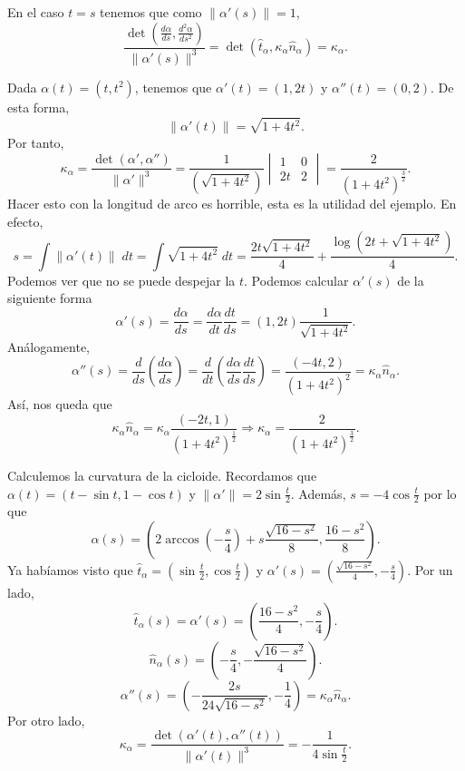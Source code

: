 \begin{observation}
En el caso $\displaystyle t = s $ tenemos que como $\displaystyle \|\alpha'\left(s\right)\| = 1 $,
\[\frac{\det\left(\frac{d\alpha }{d s}, \frac{d ^{2}\alpha }{d s^{2}}\right)}{\|\alpha'\left(s\right)\|^{3}} = \det\left(\hat{t}_{\alpha }, \kappa_{\alpha }\hat{n}_{\alpha }\right)=\kappa_{\alpha } .\]
\end{observation}

\begin{eg}
Dada $\displaystyle \alpha\left(t\right)= \left(t, t^{2}\right)$, tenemos que $\displaystyle \alpha'\left(t\right)=\left(1, 2t\right) $ y $\displaystyle \alpha''\left(t\right)=\left(0,2\right) $. De esta forma, 
\[\|\alpha'\left(t\right)\| = \sqrt{1 + 4t ^{2}} .\]
Por tanto, 
\[\kappa_{\alpha } = \frac{\det\left(\alpha', \alpha''\right)}{\|\alpha'\|^{3}} = \frac{1}{\left(\sqrt{1 + 4 t ^{2}}\right)}\begin{vmatrix} 1 & 0 \\ 2t & 2 \end{vmatrix} =\frac{2}{\left(1 + 4t ^{2}\right)^{\frac{3}{2}}} .\]
Hacer esto con la longitud de arco es horrible, esta es la utilidad del ejemplo. En efecto, 
\[s = \int \|\alpha'\left(t\right)\| \; dt = \int \sqrt{1 + 4t ^{2}} \; dt = \frac{2t\sqrt{1+4t ^{2}}}{4} + \frac{\log\left(2t + \sqrt{1 + 4t ^{2}}\right)}{4} .\]
Podemos ver que no se puede despejar la $\displaystyle t $. Podemos calcular $\displaystyle \alpha'\left(s\right) $ de la siguiente forma
\[\alpha'\left(s\right)=\frac{d\alpha }{d s} = \frac{d\alpha }{d t}\frac{dt}{d s} = \left(1, 2t\right)\frac{1}{\sqrt{1 + 4t ^{2}}} .\]
Análogamente, 
\[\alpha''\left(s\right)=\frac{d}{d s}\left(\frac{d\alpha }{d s}\right) = \frac{d}{dt}\left(\frac{d\alpha }{d s}\frac{dt}{d s}\right)=\frac{\left(-4t, 2\right)}{\left(1+4t ^{2}\right)^{2}} = \kappa_{\alpha }\hat{n}_{\alpha } .\]
Así, nos queda que 
\[\kappa_{\alpha }\hat{n}_{\alpha }=\kappa_{\alpha }\frac{\left(-2t, 1\right)}{\left(1 + 4t ^{2}\right)^{\frac{1}{2}}} \Rightarrow \kappa_{\alpha }=\frac{2}{\left(1 + 4t ^{2}\right)^{\frac{3}{2}}} .\]
\end{eg}
\begin{eg}[Cicloide]
	Calculemos la curvatura de la cicloide. Recordamos que $\displaystyle \alpha\left(t\right)=\left(t-\sin t, 1- \cos t\right) $ y $\displaystyle \|\alpha'\| = 2\sin \frac{t}{2} $. Además, $\displaystyle s = -4\cos \frac{t}{2} $ por lo que 
	\[\alpha\left(s\right)=\left(2\arccos\left(-\frac{s}{4}\right)+ s\frac{\sqrt{16-s ^{2}}}{8}, \frac{16-s^{2}}{8}\right) .\]
Ya habíamos visto que $\displaystyle \hat{t}_{\alpha }=\left(\sin \frac{t}{2}, \cos \frac{t}{2}\right) $ y $\displaystyle \alpha'\left(s\right)=\left(\frac{\sqrt{16-s^{2}}}{4}, - \frac{s}{4}\right) $. Por un lado, 
\[\hat{t}_{\alpha }\left(s\right)=\alpha'\left(s\right)=\left(\frac{16-s^{2}}{4}, - \frac{s}{4}\right) .\]
\[\hat{n}_{\alpha }\left(s\right)=\left(-\frac{s}{4}, -\frac{\sqrt{16-s^{2}}}{4}\right) .\]
\[\alpha''\left(s\right)=\left(-\frac{2s}{24\sqrt{16-s^{2}}}, -\frac{1}{4}\right)=\kappa_{\alpha }\hat{n}_{\alpha } .\]
Por otro lado, 
\[\kappa_{\alpha }=\frac{\det\left(\alpha'\left(t\right), \alpha''\left(t\right)\right)}{\|\alpha'\left(t\right)\|^{3}}=-\frac{1}{4\sin \frac{t}{2}} .\]
\end{eg}
